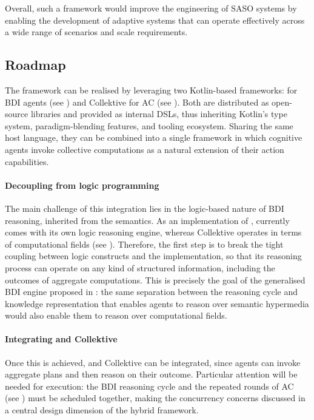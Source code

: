 Overall,
such a framework would improve the engineering of \ac{SASO} systems
by enabling the development of adaptive systems that can operate effectively
across a wide range of scenarios and scale requirements.

\subsection{Roadmap}

The framework can be realised by leveraging two Kotlin-based frameworks:
\jakta{} for \ac{BDI} agents (see )
and Collektive for \ac{AC} (see ).
%
Both are distributed as open-source libraries and provided as internal \acp{DSL},
thus inheriting Kotlin's type system, paradigm-blending features, and tooling ecosystem.
%
Sharing the same host language,
they can be combined into a single framework
in which cognitive agents invoke collective computations
as a natural extension of their action capabilities.

\paragraph{Decoupling \jakta{} from logic programming}
The main challenge of this integration lies in
the logic-based nature of \ac{BDI} reasoning,
inherited from the \agentspeak{} semantics.
%
As an implementation of \agentspeak{},
\jakta{} currently comes with its own logic reasoning engine,
whereas Collektive operates in terms of computational fields (see ).
%
Therefore,
the first step is to break the tight coupling between logic constructs and the \jakta{} implementation,
so that its reasoning process can operate on any kind of structured information,
including the outcomes of aggregate computations.
%
This is precisely the goal of the generalised \ac{BDI} engine proposed in :
the same separation between the reasoning cycle and knowledge representation
that enables agents to reason over semantic hypermedia
would also enable them to reason over computational fields.

\paragraph{Integrating \jakta{} and Collektive}
Once this is achieved,
\jakta{} and Collektive can be integrated,
since \jakta{} agents can invoke aggregate plans and then reason on their outcome.
%
Particular attention will be needed for execution:
the \ac{BDI} reasoning cycle and the repeated rounds of \ac{AC} (see )
must be scheduled together,
making the concurrency concerns discussed in 
a central design dimension of the hybrid framework.

